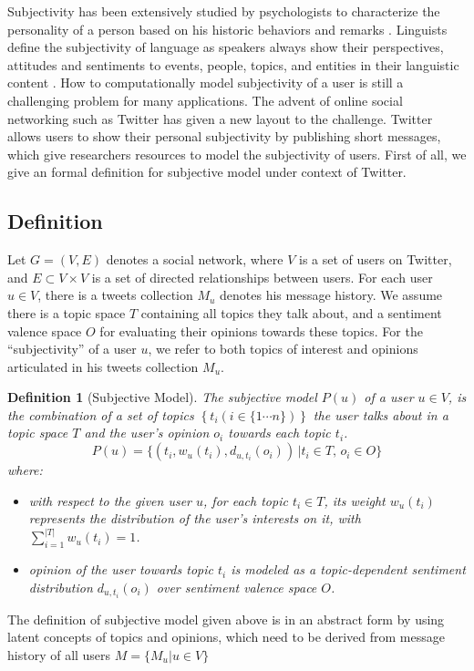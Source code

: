 \documentclass[letterpaper]{article}
\newtheorem{definition}{Definition}
\begin{document}
Subjectivity has been extensively studied by psychologists to characterize the personality of a person based on his historic behaviors and remarks \cite{Engbert2007}. 
Linguists define the subjectivity of language as speakers always show their perspectives, attitudes and sentiments to events, people, topics, and entities in their languistic content \cite{stein2005subjectivity}. 
How to computationally model subjectivity of a user is still a challenging problem for many applications. 
The advent of online social networking such as Twitter has given a new layout to the challenge.  
Twitter allows users to show their personal subjectivity by publishing short messages, which give researchers resources to model the subjectivity of users.
First of all, we give an formal definition for subjective model under context of Twitter.

\subsection{Definition}
\label{definition}

Let $G=\left( V,E \right) $ denotes a social network, where $ V $ is a set of users on Twitter, and $ E\subset V\times V $ is a set of directed relationships between users. For each user $ u \in V $, there is a tweets collection $ M_{u} $ denotes his message history. We assume there is a topic space $ T $ containing all topics they talk about, and a sentiment valence space $ O $ for evaluating their opinions towards these topics. 
For the ``subjectivity'' of a user $ u $, we refer to both topics of interest and opinions articulated in his tweets collection $ M_{u} $.  
\begin{definition}[Subjective Model]
The subjective model $ P \left( u \right) $ of a user $u \in V $, is the combination of a set of topics $\left\lbrace  t_{i} \left( i \in \lbrace1 \cdots n \rbrace \right)  \right\rbrace $ the user talks about in a topic space $T$ and the user's opinion $o_{i}$ towards each topic $ t_{i} $. 
\begin{equation}
\label{usermodel}
P \left( u \right) = \lbrace \left( t_{i}, w_{u} \left( t_{i} \right), d_{u,t_{i}} \left( o_{i} \right) \right) \,\vert  t_{i} \in T, \, o_{i} \in O \rbrace
\end{equation}
where:
\begin{itemize}
\item with respect to the given user $ u $,  for each topic $t_{i} \in T$, its  weight $ w_{u} \left( t_{i} \right)$ represents the distribution of the user's interests on it, with $ \sum_{i=1}^{|T|}w_{u} \left( t_{i} \right)=1 $.
\item opinion of the user towards topic $t_{i}$ is modeled as a topic-dependent sentiment distribution  $d_{u,t_{i}} \left( o_{i} \right)$ over sentiment valence space $ O $.
\end{itemize}
\end{definition}
The definition of subjective model given above is in an abstract form by using latent concepts of topics and opinions,  which need to be derived from message history of all users $ M=\lbrace M_{u}\vert u \in V\rbrace$  
\end{document}
